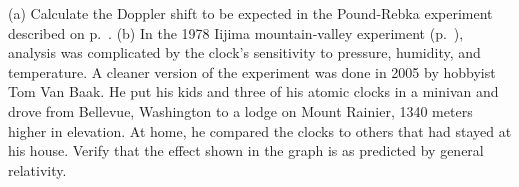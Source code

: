 (a) Calculate the Doppler shift to be expected in the Pound-Rebka experiment described on p.~\pageref{pound-rebka}.
(b) In the 1978 Iijima mountain-valley experiment (p.~\pageref{iijima}), analysis was complicated by the
clock's sensitivity to pressure, humidity, and temperature. A cleaner version of the experiment was done in
2005 by hobbyist Tom Van Baak. He put his 
kids and three of his atomic clocks in a minivan and drove from Bellevue, Washington to
a lodge on Mount Rainier, 1340 meters higher in elevation. At home, he compared the clocks
to others that had stayed at his house. 
Verify that the effect shown in the graph is as predicted by general relativity.
